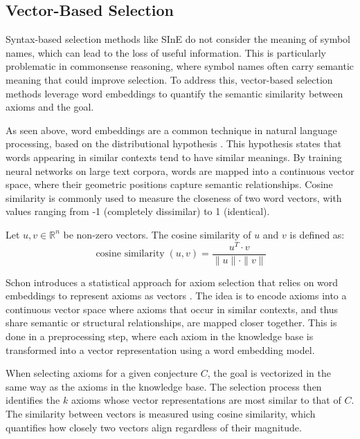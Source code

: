 \documentclass[english,version-2020-11]{uzl-thesis}
\begin{document}
\subsection{Vector-Based Selection}

Syntax-based selection methods like SInE do not consider the meaning of symbol names, which can lead to the loss of useful information. This is particularly problematic in commonsense reasoning, where symbol names often carry semantic meaning that could improve selection. To address this, vector-based selection methods leverage word embeddings to quantify the semantic similarity between axioms and the goal.

As seen above, word embeddings are a common technique in natural language processing, based on the distributional hypothesis \cite{Miller1991}. This hypothesis states that words appearing in similar contexts tend to have similar meanings. By training neural networks on large text corpora, words are mapped into a continuous vector space, where their geometric positions capture semantic relationships. Cosine similarity is commonly used to measure the closeness of two word vectors, with values ranging from -1 (completely dissimilar) to 1 (identical).

\begin{definition}
    Let \( u, v \in \mathbb{R}^n \) be non-zero vectors. The cosine similarity of \( u \) and \( v \) is defined as:
    \begin{equation}
        \operatorname{cosine\ similarity}(u, v) = \frac{u^T \cdot v}{\|u\| \cdot \|v\|}
    \end{equation}
\end{definition}

Schon introduces a statistical approach for axiom selection that relies on word embeddings to represent axioms as vectors \cite{Schon2023}. The idea is to encode axioms into a continuous vector space where axioms that occur in similar contexts, and thus share semantic or structural relationships, are mapped closer together. This is done in a preprocessing step, where each axiom in the knowledge base is transformed into a vector representation using a word embedding model.

When selecting axioms for a given conjecture \( C \), the goal is vectorized in the same way as the axioms in the knowledge base. The selection process then identifies the \( k \) axioms whose vector representations are most similar to that of \( C \). The similarity between vectors is measured using cosine similarity, which quantifies how closely two vectors align regardless of their magnitude.
\end{document}
